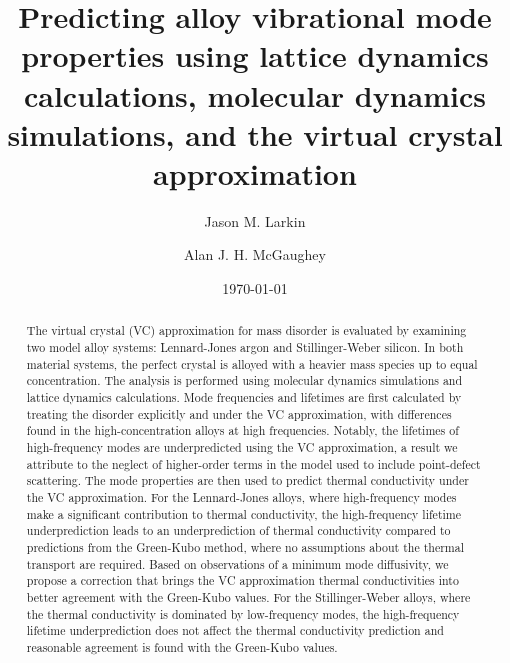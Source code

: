 \documentclass[aps,prb,onecolumn,preprint,footinbib,superscriptaddress,amsmath,amssymb,floatfix]{revtex4}
\begin{document}

\title{Predicting alloy vibrational mode properties using lattice
dynamics calculations, molecular dynamics simulations, and the virtual
crystal approximation}
\author{Jason M. Larkin}
\author{Alan J. H. McGaughey}

\date{\today}


\begin{abstract}
The virtual crystal (VC) approximation for mass disorder is evaluated by
examining two model alloy systems: Lennard-Jones argon and Stillinger-Weber
silicon. 
In both material systems, the perfect crystal is alloyed with a heavier mass
species up to equal concentration.
The analysis is performed using molecular dynamics simulations and lattice
dynamics calculations.
Mode frequencies and lifetimes are first calculated by treating the disorder
explicitly and under the VC approximation, with differences found in the
high-concentration alloys at high frequencies. 
Notably, the lifetimes of high-frequency modes are underpredicted using the
VC approximation, a result we attribute to the neglect of higher-order terms 
in the model used to include point-defect scattering.
The mode properties are then used to predict thermal conductivity under the
VC approximation.
For the Lennard-Jones alloys, where high-frequency modes make a significant
contribution to thermal conductivity, the high-frequency lifetime
underprediction leads to an underprediction of thermal conductivity compared
to predictions from the Green-Kubo method, where no assumptions about the
thermal transport are required.
Based on observations of a minimum mode diffusivity, we propose a correction
that brings the VC approximation thermal conductivities into better 
agreement with the Green-Kubo values. 
For the Stillinger-Weber alloys, where the thermal conductivity is dominated
by low-frequency modes, the high-frequency lifetime underprediction does not
affect the thermal conductivity prediction and reasonable agreement is found
with the Green-Kubo values. 
\end{abstract}
\end{document}
